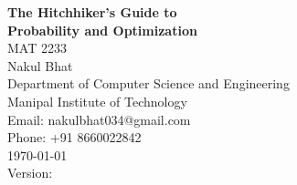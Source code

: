 \newcommand{\titlepagebreak}{\\[1em]}
\begin{titlepage}
    \vspace*{\fill} %

    \centering
    {\Huge \bfseries The Hitchhiker's Guide to\titlepagebreak Probability and Optimization}\\[1in]
    
    {\Large MAT 2233}\\[0.75in]
    
    {\huge Nakul Bhat}\\[0.5in]
    
    {\large Department of Computer Science and Engineering \titlepagebreak Manipal Institute of Technology}\\[0.5in]
    
    {\large Email: nakulbhat034@gmail.com \titlepagebreak Phone: +91 8660022842}\\[1.5cm]
    
    {\large \today}\\[0.5cm]
    
    {\large Version: \versionNumber}

    \vspace*{\fill} %
\end{titlepage}
\restoregeometry